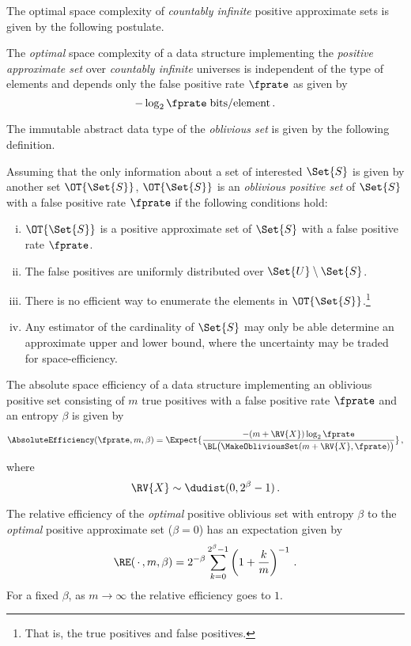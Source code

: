 \documentclass[ ../main.tex]{subfiles}
\begin{document}
The optimal space complexity of \emph{countably infinite} positive approximate sets is given by the following postulate.
\begin{postulate}
The \emph{optimal} space complexity of a data structure implementing the \emph{positive approximate set} over \emph{countably infinite} universes is independent of the type of elements and depends only the false positive rate $\fprate$ as given by
\begin{equation}
    -\log_2 \fprate \; \si{bits \per element}\,.
\end{equation}
\end{postulate}

The immutable abstract data type of the \emph{oblivious set}\cite{obset} is given by the following definition.
\begin{definition}
\label{def:obliviousset}
Assuming that the only information about a set of interested $\Set{S}$ is given by another set $\OT{\Set{S}}$, $\OT{\Set{S}}$ is an \emph{oblivious positive set} of $\Set{S}$ with a false positive rate $\fprate$ if the following conditions hold:
\begin{enumerate}[(i)]
    \item $\OT{\Set{S}}$ is a positive approximate set of $\Set{S}$ with a false positive rate $\fprate$.
    \item The false positives are uniformly distributed over $\Set{U} \setminus \Set{S}$.
    \item There is no efficient way to enumerate the elements in $\OT{\Set{S}}$.\footnote{That is, the true positives and false positives.}
    \item Any estimator of the cardinality of $\Set{S}$ may only be able determine an approximate upper and lower bound, where the uncertainty may be traded for space-efficiency.
\end{enumerate}
\end{definition}

The absolute space efficiency of a data structure implementing an oblivious positive set consisting of $m$ true positives with a false positive rate $\fprate$ and an entropy $\beta$ is given by
\begin{equation}
    \AbsoluteEfficiency(\fprate, m, \beta) = \Expect{\frac{-(m + \RV{X}) \log_2 \fprate}{\BL\!\left(\MakeObliviousSet(m + \RV{X},\fprate)\right)}}\,,
\end{equation}
where
\begin{equation}
    \RV{X} \sim \dudist(0,2^\beta - 1)\,.
\end{equation}

The relative efficiency of the \emph{optimal} positive oblivious set with entropy $\beta$ to the \emph{optimal} positive approximate set ($\beta = 0$) has an expectation given by
\begin{equation}
    \RE(\,\cdot\,, m, \beta) = 2^{-\beta} \sum_{k=0}^{2^\beta-1} \left(1 + \frac{k}{m}\right)^{-1}\,.
\end{equation}
For a fixed $\beta$, as $m \to \infty$ the relative efficiency goes to $1$.
\end{document}

